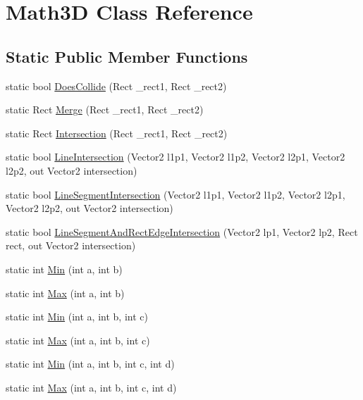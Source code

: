\hypertarget{class_math3_d}{\section{Math3\+D Class Reference}
\label{class_math3_d}
}
\subsection*{Static Public Member Functions}
\begin{DoxyCompactItemize}
\item 
static bool \hyperlink{class_math3_d_abba7bac7a2454e4f137b4a07d101c37c}{Does\+Collide} (Rect \+\_\+rect1, Rect \+\_\+rect2)
\item 
static Rect \hyperlink{class_math3_d_a433c33fb7309b22a5738e6c851e6049b}{Merge} (Rect \+\_\+rect1, Rect \+\_\+rect2)
\item 
static Rect \hyperlink{class_math3_d_a5020d96a9f83308adab28af85b28413c}{Intersection} (Rect \+\_\+rect1, Rect \+\_\+rect2)
\item 
static bool \hyperlink{class_math3_d_a2b14803e6822d9f435d8609af3bc97e3}{Line\+Intersection} (Vector2 l1p1, Vector2 l1p2, Vector2 l2p1, Vector2 l2p2, out Vector2 intersection)
\item 
static bool \hyperlink{class_math3_d_a0f1cd9ce1aae129fcb3656dec177ebc9}{Line\+Segment\+Intersection} (Vector2 l1p1, Vector2 l1p2, Vector2 l2p1, Vector2 l2p2, out Vector2 intersection)
\item 
static bool \hyperlink{class_math3_d_aee3902340540133af4d0eae3aff415f1}{Line\+Segment\+And\+Rect\+Edge\+Intersection} (Vector2 lp1, Vector2 lp2, Rect rect, out Vector2 intersection)
\item 
static int \hyperlink{class_math3_d_a64a485ac8b78235c1580760ca6ebca1e}{Min} (int a, int b)
\item 
static int \hyperlink{class_math3_d_a10fbd3c0b792f3bdf8fd9d8260ca8d8c}{Max} (int a, int b)
\item 
static int \hyperlink{class_math3_d_ad06d682d8f260ff4dd5b84489330fbac}{Min} (int a, int b, int c)
\item 
static int \hyperlink{class_math3_d_a751799045a0da520eb069d48bb0b9cf1}{Max} (int a, int b, int c)
\item 
static int \hyperlink{class_math3_d_afd22b4bb805fbab0f9f08886d6678ec2}{Min} (int a, int b, int c, int d)
\item 
static int \hyperlink{class_math3_d_a647e4fe1e9c2f6682716acc5d43a6ea2}{Max} (int a, int b, int c, int d)

\end{DoxyCompactItemize}
